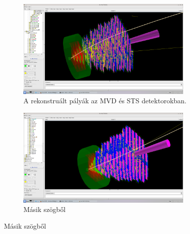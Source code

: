 \documentclass[a4paper,12pt]{article}
\begin{document}
\begin{figure}[H]
	\centering
	\begin{subfigure}{0.49\textwidth}
		\centering
		\includegraphics[width=0.95\textwidth]{reco2.png}
		\caption{ A rekonstruált pályák az MVD és STS detektorokban. }
	\end{subfigure}
	\begin{subfigure}{0.49\textwidth}
		\centering
		\includegraphics[width=0.95\textwidth]{reco1.png}
		\caption{ Másik szögből }
	\end{subfigure}
\end{figure}
\end{document}
